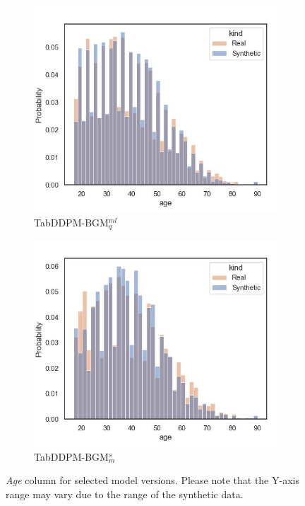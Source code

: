 \begin{figure}[h]
\begin{subfigure}{0.23\textwidth}
		\includegraphics[width=\textwidth]{images/dist_age/tab-ddpm-bgm.jpg}
		\caption{TabDDPM-BGM$^{ml}_q$}
	\end{subfigure}
	\begin{subfigure}{0.23\textwidth}
		\centering
		\includegraphics[width=\textwidth]{images/dist_age/tab-ddpm-bgm-simTune-minmax.jpg}
		\caption{TabDDPM-BGM$^{s}_m$}
	\end{subfigure}
	\caption[Distribution Plots Continuous]{\textit{Age} column for selected model versions. Please note that the Y-axis range may vary due to the range of the synthetic data.}
	\label{fig:age}
\end{figure}

